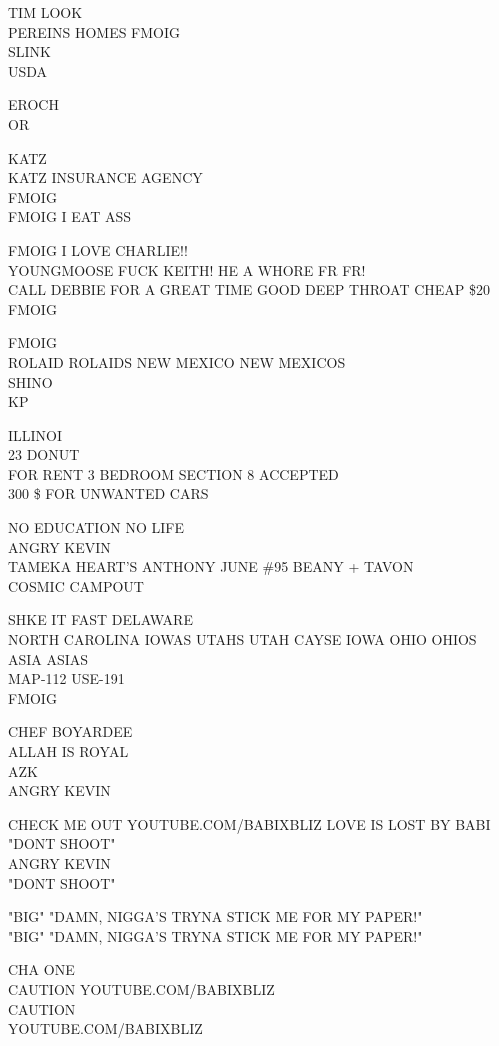 \documentclass[10pt,letterpaper]{article}
\begin{document}
TIM LOOK\\
PEREINS HOMES FMOIG\\
SLINK\\
USDA

EROCH\\
OR

KATZ\\
KATZ INSURANCE AGENCY\\
FMOIG\\
FMOIG I EAT ASS

FMOIG I LOVE CHARLIE!!\\
YOUNGMOOSE FUCK KEITH! HE A WHORE FR FR!\\
CALL DEBBIE FOR A GREAT TIME GOOD DEEP THROAT CHEAP \$20\\
FMOIG

FMOIG\\
ROLAID ROLAIDS NEW MEXICO NEW MEXICOS\\
SHINO\\
KP

ILLINOI\\
23 DONUT\\
FOR RENT 3 BEDROOM SECTION 8 ACCEPTED\\
300 \$ FOR UNWANTED CARS

NO EDUCATION NO LIFE\\
ANGRY KEVIN\\
TAMEKA HEART'S ANTHONY JUNE \#95 BEANY + TAVON\\
COSMIC CAMPOUT

SHKE IT FAST DELAWARE\\
NORTH CAROLINA IOWAS UTAHS UTAH CAYSE IOWA OHIO OHIOS ASIA ASIAS\\
MAP{-}112 USE{-}191\\
FMOIG

CHEF BOYARDEE\\
ALLAH IS ROYAL\\
AZK\\
ANGRY KEVIN

CHECK ME OUT YOUTUBE.COM/BABIXBLIZ LOVE IS LOST BY BABI "DONT SHOOT"\\
ANGRY KEVIN\\
"DONT SHOOT"

"BIG" "DAMN, NIGGA'S TRYNA STICK ME FOR MY PAPER!"\\
"BIG" "DAMN, NIGGA'S TRYNA STICK ME FOR MY PAPER!"

CHA ONE\\
CAUTION YOUTUBE.COM/BABIXBLIZ\\
CAUTION\\
YOUTUBE.COM/BABIXBLIZ
\end{document}
